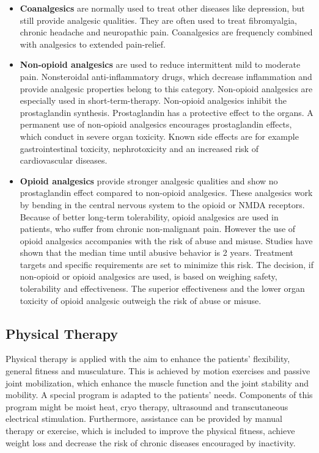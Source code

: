 \begin{itemize}
\item \textbf{Coanalgesics} are normally used to treat other diseases like depression, but still provide analgesic qualities. They are often used to treat fibromyalgia, chronic headache and neuropathic pain. Coanalgesics are frequencly combined with analgesics to extended pain-relief. \cite{marcus2009}

\item \textbf{Non-opioid analgesics} are used to reduce intermittent mild to moderate pain. Nonsteroidal anti-inflammatory drugs, which decrease inflammation and provide analgesic properties belong to this category. Non-opioid analgesics are especially used in short-term-therapy. Non-opioid analgesics inhibit the prostaglandin synthesis. Prostaglandin has a protective effect to the organs. A permanent use of non-opioid analgesics encourages prostaglandin effects, which conduct in severe organ toxicity. Known side effects are for example gastrointestinal toxicity, nephrotoxicity and an increased risk of cardiovascular diseases. \cite{marcus2009,stein2007}

\item \textbf{Opioid analgesics} provide stronger analgesic qualities and show no prostaglandin effect compared to non-opioid analgesics. These analgesics work by bending in the central nervous system to the opioid or NMDA receptors.  Because of better long-term tolerability, opioid analgesics are used in patients, who suffer from chronic non-malignant pain. However the use of opioid analgesics accompanies with the risk of abuse and misuse. Studies have shown that the median time until abusive behavior is 2 years. Treatment targets and specific requirements are set to minimize this risk. \cite{marcus2009,stein2007}
The decision, if non-opioid or opioid analgesics are used, is based on weighing safety, tolerability and effectiveness. The superior effectiveness and the lower organ toxicity of opioid analgesic outweigh the risk of abuse or misuse. \cite{marcus2009} 
\end{itemize}

\subsection{Physical Therapy}
Physical therapy is applied with the aim to enhance the patients' flexibility, general fitness and musculature. This is achieved by motion exercises and passive joint mobilization, which enhance the muscle function and the joint stability and mobility. A special program is adapted to the patients' needs. Components of this program might be moist heat, cryo therapy, ultrasound and transcutaneous electrical stimulation. Furthermore, assistance can be provided by manual therapy or exercise, which is included to improve the physical fitness, achieve weight loss and decrease the risk of chronic diseases encouraged by inactivity. \cite{marcus2009,pope2017}

